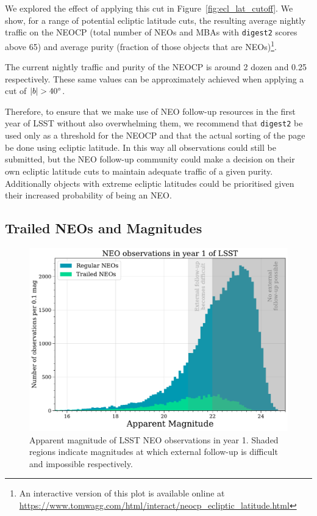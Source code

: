 \documentclass[twocolumn]{aastex631}
\newcommand{\dig}{\texttt{digest2}}
\begin{document}
We explored the effect of applying this cut in Figure~\ref{fig:ecl_lat_cutoff}. We show, for a range of potential ecliptic latitude cuts, the resulting average nightly traffic on the NEOCP (total number of NEOs and MBAs with \dig{} scores above 65) and average purity (fraction of those objects that are NEOs)\footnote{An interactive version of this plot is available online at \url{https://www.tomwagg.com/html/interact/neocp_ecliptic_latitude.html}}.

The current nightly traffic and purity of the NEOCP is around 2 dozen and 0.25 respectively. These same values can be approximately achieved when applying a cut of $\abs{b} > 40^\circ$.

Therefore, to ensure that we make use of NEO follow-up resources in the first year of LSST without also overwhelming them, we recommend that \dig{} be used only as a threshold for the NEOCP and that the actual sorting of the page be done using ecliptic latitude. In this way all observations could still be submitted, but the NEO follow-up community could make a decision on their own ecliptic latitude cuts to maintain adequate traffic of a given purity. Additionally objects with extreme ecliptic latitudes could be prioritised given their increased probability of being an NEO.

\subsection{Trailed NEOs and Magnitudes}\label{sec:trailed_neos}

\begin{figure}[tb]
    \centering
    \includegraphics[width=\columnwidth]{figures/neo_magnitudes.pdf}
    \caption{Apparent magnitude of LSST NEO observations in year 1. Shaded regions indicate magnitudes at which external follow-up is difficult and impossible respectively.}
    \label{fig:neo_magnitudes}
\end{figure}
\end{document}

